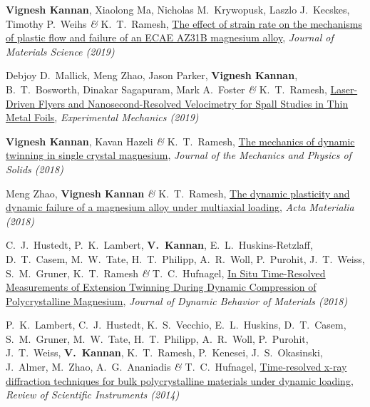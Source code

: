 \documentclass[a4paper,10pt, oneside]{article}
\begin{document}
\begin{enumerate}[label={[\arabic*]}, leftmargin=*]
		\item \textbf{Vignesh Kannan}, Xiaolong Ma, Nicholas M.~Krywopusk, Laszlo J.~Kecskes, Timothy P.~Weihs \emph{\&} K.~T.~Ramesh, \href{https://link.springer.com/article/10.1007/s10853-019-03838-5}{The effect of strain rate on the mechanisms of plastic flow and failure of an ECAE AZ31B magnesium alloy}, \textit{Journal of Materials Science (2019)} \label{jms2019}
		\item Debjoy D.~Mallick, Meng Zhao, Jason Parker, \textbf{Vignesh Kannan}, B.~T.~Bosworth, Dinakar Sagapuram, Mark A.~Foster \emph{\&} K.~T.~Ramesh, \href{https://link.springer.com/article/10.1007/s11340-019-00519-x}{Laser-Driven Flyers and Nanosecond-Resolved Velocimetry for Spall Studies in Thin Metal Foils}, \textit{Experimental Mechanics (2019)} \label{em2019}
		\item \textbf{Vignesh Kannan}, Kavan Hazeli \emph{\&} K.~T.~Ramesh, \href{https://www.sciencedirect.com/science/article/pii/S0022509617309201}{The mechanics of dynamic twinning in single crystal magnesium}, \textit{Journal of the Mechanics and Physics of Solids (2018)} \label{jmps2018}
		\item Meng Zhao, \textbf{Vignesh Kannan} \emph{\&} K.~T.~Ramesh, \href{https://www.sciencedirect.com/science/article/pii/S1359645418303641}{The dynamic plasticity and dynamic failure of a magnesium alloy under multiaxial loading}, \textit{Acta Materialia (2018)} \label{actmat2018}
		\item C.~J.~Hustedt, P.~K.~Lambert, \textbf{V.~Kannan}, E.~L.~Huskins-Retzlaff, D.~T.~Casem, M.~W.~Tate, H.~T.~Philipp, A.~R.~Woll, P.~Purohit, J.~T.~Weiss, S.~M.~Gruner, K.~T.~Ramesh \emph{\&} T.~C.~Hufnagel, \href{https://link.springer.com/article/10.1007/s40870-018-0152-8}{In Situ Time-Resolved Measurements of Extension Twinning During Dynamic Compression of Polycrystalline Magnesium}, \textit{Journal of Dynamic Behavior of Materials (2018)} \label{jdbm2018}
		\item P.~K.~Lambert, C.~J.~Hustedt, K.~S.~Vecchio, E.~L.~Huskins, D.~T.~Casem, S.~M.~Gruner, M.~W.~Tate, H.~T.~Philipp, A.~R.~Woll, P.~Purohit, J.~T.~Weiss, \textbf{V.~Kannan}, K.~T.~Ramesh, P.~Kenesei, J.~S.~Okasinski, J.~Almer, M.~Zhao, A.~G.~Ananiadis \emph{\&} T.~C.~Hufnagel, \href{https://aip.scitation.org/doi/full/10.1063/1.4893881}{Time-resolved x-ray diffraction techniques for bulk polycrystalline materials under dynamic loading}, \textit{Review of Scientific Instruments (2014)} \label{rsi2014}
	\end{enumerate}
\end{document}
